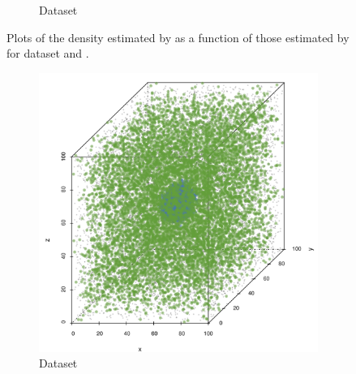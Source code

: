 \begin{figure}
\begin{subfigure}{0.23\textwidth}
				\caption{Dataset \baakmanThree}
				\label{fig:discussion:performance:mbevssambe:baakman3}
			\end{subfigure}	
			\caption{Plots of the density estimated by \sambe as a function of those estimated by \mbe for dataset %
				\ferdosiThree and %
				\baakmanThree.
			}
			\label{fig:discussion:performance:four:mbevssambe}
		\end{figure}

		\begin{figure}
			\centering
			\begin{subfigure}{0.23\textwidth}
				\centering
				\includegraphics[keepaspectratio=true, width=\textwidth, height=0.23\textheight]{discussion/img/ferdosi_1_abs_error_mbeSmallerThansambe}
				\caption{Dataset \ferdosiOne}
				\label{fig:discussion:performance:mbeLowerError:ferdosi1}
			\end{subfigure}
			\begin{subfigure}{0.23\textwidth}
				\centering

\end{subfigure}
\end{figure}
